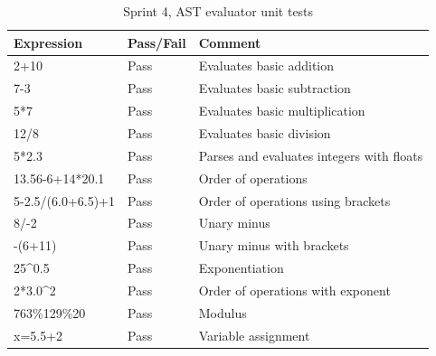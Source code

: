 \documentclass[a4paper, oneside, 11pt]{report}
\begin{document}
\begin{table}[h]
\caption{Sprint 4, AST evaluator unit tests}
\label{sprint4-ast-evaluator-test}
\begin{tabular}{|l|l|l|}
\hline
\textbf{Expression} & \textbf{Pass/Fail} & \textbf{Comment}                                                                     \\ \hline
2+10                & Pass               & Evaluates basic addition                                                             \\ \hline
7-3                 & Pass               & Evaluates basic subtraction                                                          \\ \hline
5*7                 & Pass               & Evaluates basic multiplication                                                       \\ \hline
12/8                & Pass               & Evaluates basic division                                                             \\ \hline
5*2.3               & Pass               & Parses and evaluates integers with floats                                            \\ \hline
13.56-6+14*20.1     & Pass               & Order of operations                                                                  \\ \hline
5-2.5/(6.0+6.5)+1   & Pass               & Order of operations using brackets                                                   \\ \hline
8/-2                & Pass               & Unary minus                                                                          \\ \hline
-(6+11)             & Pass               & Unary minus with brackets                                                            \\ \hline
25\^{}0.5           & Pass               & Exponentiation                                                                       \\ \hline
2*3.0\^{}2          & Pass               & Order of operations with exponent                                                    \\ \hline
763\%129\%20        & Pass               & Modulus                                                                              \\ \hline
x=5.5+2             & Pass               & Variable assignment                                                                  \\ \hline

\end{tabular}
\end{table}
\end{document}
